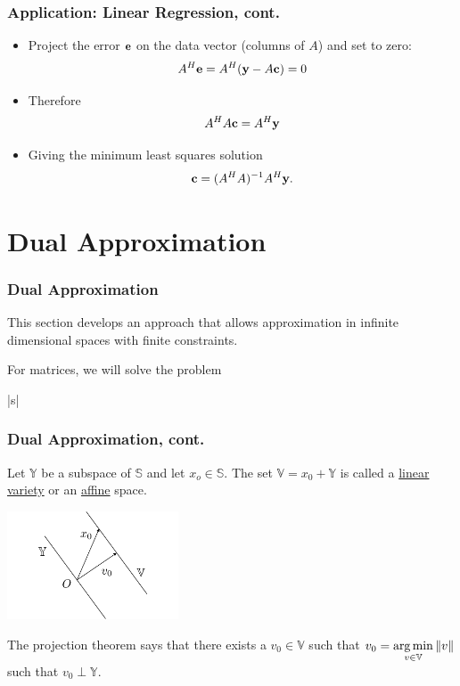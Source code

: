 \documentclass{beamer}
\begin{document}
\begin{frame}\frametitle{Application: Linear Regression, cont.}	
	\begin{itemize}
	\item Project the error $\mathbf{e}$ on the data vector (columns of $A$) and set to zero:
	\[
	A^H \mathbf{e} = A^H (\mathbf{y} - A\mathbf{c}) =0
	\]
	
	\item Therefore
	\[ A^H A \mathbf{c} = A^H \mathbf{y} \]
	
	\item Giving the minimum least squares solution
	\[ \mathbf{c} = (A^H A)^{-1} A^H \mathbf{y}. \]
	
	\end{itemize}	
\end{frame}


\section{Dual Approximation}
\frame{\sectionpage}

\begin{frame}\frametitle{Dual Approximation}
	This section develops an approach that allows approximation in infinite dimensional spaces with finite constraints.
	
	\vfill
	
	For matrices, we will solve the problem
	\begin{mini*}|s|
	{}{}{}{}
	\end{mini*}
\end{frame}

\begin{frame}\frametitle{Dual Approximation, cont.}
\begin{definition}
	Let $\mathbb{Y}$ be a subspace of $\mathbb{S}$ and let $x_o \in \mathbb{S}$.  The set $\mathbb{V} = x_0 + \mathbb{Y}$ is called a \underline{linear variety} or an \underline{affine} space.
	\begin{center}
	\includegraphics[width=2in]{figures/chap3_affine_space}
	\end{center}
\end{definition}
	
	The projection theorem says that there exists a $v_0 \in \mathbb{V}$ such that
	$v_0 = \underset{v \in \mathbb{V}}{\arg\min}\left\| v \right\|$ such that
	$v_0 \perp \mathbb{Y}$.

\end{frame}
\end{document}
